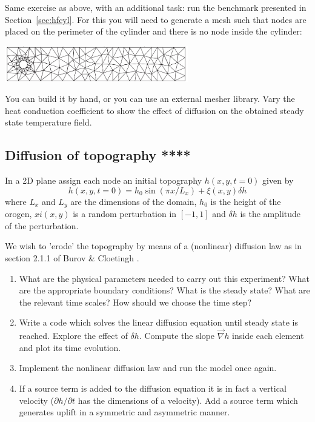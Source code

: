 Same exercise as above, with an additional task: run the benchmark
presented in Section~\ref{sec:hfcyl}.
For this you will need to generate a mesh 
such that nodes are placed on the perimeter of the cylinder and there is 
no node inside the cylinder:

\includegraphics[width=8cm]{images/compgeo/hole}

You can build it 
by hand, or you can use an external mesher library.
Vary the heat conduction coefficient to show the effect of diffusion on the obtained
steady state temperature field.  

\subsection{Diffusion of topography ****}

In a 2D plane assign each node an initial topography $h(x,y,t=0)$ given by 
\[
h(x,y,t=0)= h_0 \sin(\pi x/L_x) + \xi(x,y) \delta h
\]
where $L_x$ and $L_y$ are the dimensions of the domain, $h_0$ is the 
height of the orogen, $xi(x,y)$ is a random perturbation in $[-1,1]$
and $\delta h$ is the amplitude of the perturbation.

We wish to 'erode' the topography by means of a (nonlinear) diffusion law
as in section 2.1.1 of Burov \& Cloetingh \cite{bucl97}.

\begin{enumerate}
\item What are the physical parameters needed to carry out this experiment? 
What are the appropriate boundary conditions? 
What is the steady state? What are the relevant time scales? How should we choose the time step?
\item Write a code which solves the linear diffusion equation until steady state is reached.
Explore the effect of $\delta h$. Compute the slope $\vec\nabla h$ inside each element and plot 
its time evolution. 
\item Implement the nonlinear diffusion law and run the model once again. 
\item If a source term is added to the diffusion equation it is in fact a vertical velocity
($\partial h/\partial t$ has the dimensions of a velocity). Add a source term which generates 
uplift in a symmetric and asymmetric manner.  
\end{enumerate}

